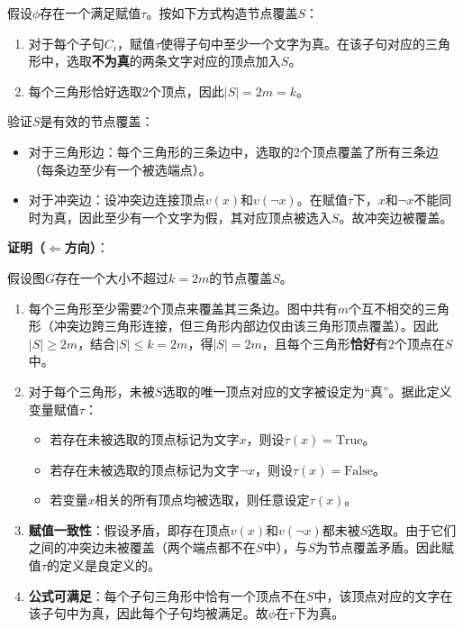 \documentclass{sysucseexp}
\begin{document}
假设$\phi$存在一个满足赋值$\tau$。按如下方式构造节点覆盖$S$：
\begin{enumerate}
    \item 对于每个子句$C_i$，赋值$\tau$使得子句中至少一个文字为真。在该子句对应的三角形中，选取\textbf{不为真}的两条文字对应的顶点加入$S$。
    \item 每个三角形恰好选取2个顶点，因此$|S| = 2m = k$。
\end{enumerate}

验证$S$是有效的节点覆盖：
\begin{itemize}
    \item 对于三角形边：每个三角形的三条边中，选取的2个顶点覆盖了所有三条边（每条边至少有一个被选端点）。
    \item 对于冲突边：设冲突边连接顶点$v(x)$和$v(\neg x)$。在赋值$\tau$下，$x$和$\neg x$不能同时为真，因此至少有一个文字为假，其对应顶点被选入$S$。故冲突边被覆盖。
\end{itemize}

\textbf{证明（$\Leftarrow$方向）}：

假设图$G$存在一个大小不超过$k = 2m$的节点覆盖$S$。

\begin{enumerate}
    \item 每个三角形至少需要2个顶点来覆盖其三条边。图中共有$m$个互不相交的三角形（冲突边跨三角形连接，但三角形内部边仅由该三角形顶点覆盖）。因此$|S| \geq 2m$，结合$|S| \leq k = 2m$，得$|S| = 2m$，且每个三角形\textbf{恰好}有2个顶点在$S$中。
    \item 对于每个三角形，未被$S$选取的唯一顶点对应的文字被设定为``真''。据此定义变量赋值$\tau$：
    \begin{itemize}
        \item 若存在未被选取的顶点标记为文字$x$，则设$\tau(x) = \text{True}$。
        \item 若存在未被选取的顶点标记为文字$\neg x$，则设$\tau(x) = \text{False}$。
        \item 若变量$x$相关的所有顶点均被选取，则任意设定$\tau(x)$。
    \end{itemize}
    \item \textbf{赋值一致性}：假设矛盾，即存在顶点$v(x)$和$v(\neg x)$都未被$S$选取。由于它们之间的冲突边未被覆盖（两个端点都不在$S$中），与$S$为节点覆盖矛盾。因此赋值$\tau$的定义是良定义的。
    \item \textbf{公式可满足}：每个子句三角形中恰有一个顶点不在$S$中，该顶点对应的文字在该子句中为真，因此每个子句均被满足。故$\phi$在$\tau$下为真。
\end{enumerate}
\end{document}
